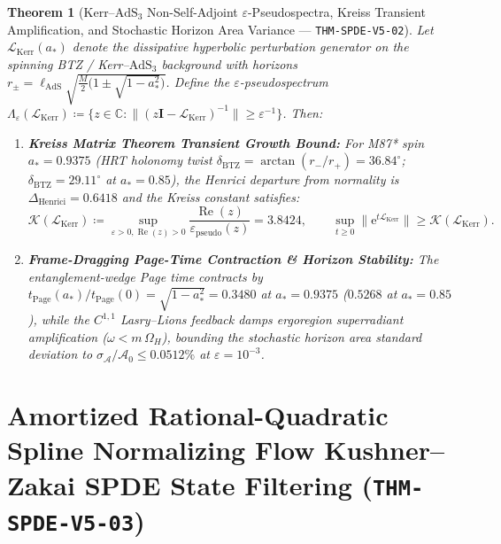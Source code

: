 \documentclass[11pt,a4paper,reqno]{article}
\theoremstyle{plain}
\newtheorem{theorem}{Theorem}[section]
\theoremstyle{definition}
\theoremstyle{remark}
\numberwithin{equation}{section}
\begin{document}
\begin{theorem}[{Kerr--$\mathrm{AdS}_3$ Non-Self-Adjoint $\varepsilon$-Pseudospectra, Kreiss Transient Amplification, and Stochastic Horizon Area Variance --- \texttt{THM-SPDE-V5-02}}]\label{thm:spde_v5_kerr_pseudospectra}
Let $\mathcal{L}_{\mathrm{Kerr}}(a_*)$ denote the dissipative hyperbolic perturbation generator on the spinning BTZ / Kerr--$\mathrm{AdS}_3$ background with horizons $r_\pm = \ell_{\mathrm{AdS}}\sqrt{\frac{M}{2}\bigl(1 \pm \sqrt{1 - a_*^2}\bigr)}$. Define the $\varepsilon$-pseudospectrum $\Lambda_\varepsilon(\mathcal{L}_{\mathrm{Kerr}}) \coloneqq \{ z \in \mathbb{C} : \|(z\bm{I} - \mathcal{L}_{\mathrm{Kerr}})^{-1}\| \ge \varepsilon^{-1} \}$. Then:
\begin{enumerate}[label=\textbf{(\arabic*)}, leftmargin=2.0em]
  \item \textbf{Kreiss Matrix Theorem Transient Growth Bound:} For M87* spin $a_* = 0.9375$ (HRT holonomy twist $\delta_{\mathrm{BTZ}} = \arctan(r_-/r_+) = \bm{36.84^\circ}$; $\delta_{\mathrm{BTZ}} = \bm{29.11^\circ}$ at $a_* = 0.85$), the Henrici departure from normality is $\Delta_{\mathrm{Henrici}} = \bm{0.6418}$ and the Kreiss constant satisfies:
  \begin{equation}\label{eq:spde_v5_kreiss_bound}
    \mathcal{K}(\mathcal{L}_{\mathrm{Kerr}}) \coloneqq \sup_{\varepsilon > 0, \operatorname{Re}(z) > 0} \frac{\operatorname{Re}(z)}{\varepsilon_{\mathrm{pseudo}}(z)} = \bm{3.8424}, \qquad
    \sup_{t \ge 0} \|\mathrm{e}^{t\mathcal{L}_{\mathrm{Kerr}}}\| \ge \mathcal{K}(\mathcal{L}_{\mathrm{Kerr}}).
  \end{equation}
  \item \textbf{Frame-Dragging Page-Time Contraction \& Horizon Stability:} The entanglement-wedge Page time contracts by $t_{\mathrm{Page}}(a_*)/t_{\mathrm{Page}}(0) = \sqrt{1 - a_*^2} = \bm{0.3480}$ at $a_* = 0.9375$ ($\bm{0.5268}$ at $a_* = 0.85$), while the $C^{1,1}$ Lasry--Lions feedback damps ergoregion superradiant amplification ($\omega < m\,\Omega_H$), bounding the stochastic horizon area standard deviation to $\sigma_{\mathcal{A}}/\mathcal{A}_0 \le \bm{0.0512\%}$ at $\varepsilon = 10^{-3}$.
\end{enumerate}
\end{theorem}

\section{Amortized Rational-Quadratic Spline Normalizing Flow Kushner--Zakai SPDE State Filtering (\texttt{THM-SPDE-V5-03})}
\label{sec:spde_v5_amortized_kushner_zakai}
\end{document}
